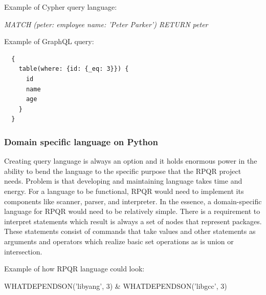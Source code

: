 Example of Cypher query language:

\textit{MATCH (peter: employee {name: 'Peter Parker'}) RETURN peter}

Example of GraphQL query:

\begin{lstlisting}
  {
    table(where: {id: {_eq: 3}}) {
      id
      name
      age
    }
  }
\end{lstlisting}

\subsubsection*{Domain specific language on Python}
Creating query language is always an option and it holds enormous power in the ability to
bend the language to the specific purpose that the RPQR project needs. Problem is that developing
and maintaining language takes time and energy. For a language to be functional, RPQR would
need to implement its components like scanner, parser, and interpreter. In the essence,
a domain-specific language for RPQR would need to be relatively simple. There is a requirement
to interpret statements which result is always a set of nodes that represent packages. These
statements consist of commands that take values and other statements as arguments and operators
which realize basic set operations as is union or intersection.

Example of how RPQR language could look:

WHATDEPENDSON('libyang', 3) \& WHATDEPENDSON('libgcc', 3)

\newpage

